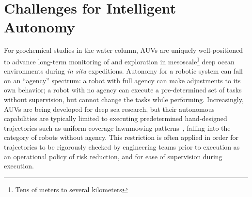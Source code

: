 

\section{Challenges for Intelligent Autonomy}
For geochemical studies in the water column, AUVs are uniquely well-positioned to advance long-term monitoring of and exploration in mesoscale\footnote{Tens of meters to several kilometers} deep ocean environments during \emph{in situ} expeditions.
Autonomy for a robotic system can fall on an ``agency'' spectrum: a robot with full agency can make adjustments to its own behavior; a robot with no agency can execute a pre-determined set of tasks without supervision, but cannot change the tasks while performing.
Increasingly, AUVs are being developed for deep sea research\autocite{kaiser2016design,yuh2000design,okamoto2019visual,maki2014auv}, but their autonomous capabilities are typically limited to executing predetermined hand-designed trajectories such as uniform coverage lawnmowing patterns~\autocite{camilli2010tracking}, falling into the category of robots without agency.
This restriction is often applied in order for trajectories to be rigorously checked by engineering teams prior to execution as an operational policy of risk reduction, and for ease of supervision during execution.

